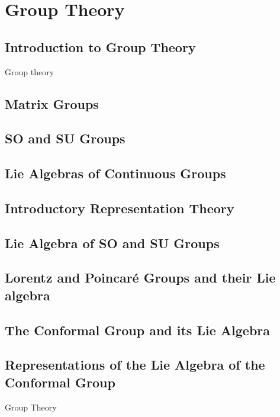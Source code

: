 \section{Group Theory}
\subsection{Introduction to Group Theory}
Group theory
\subsection{Matrix Groups}
\subsection{SO and SU Groups}
\subsection{Lie Algebras of Continuous Groups}
\subsection{Introductory Representation Theory}
\subsection{Lie Algebra of SO and SU Groups}
\subsection{Lorentz and Poincaré Groups and their Lie algebra}
\subsection{The Conformal Group and its Lie Algebra}
\subsection{Representations of the Lie Algebra of the Conformal Group}
Group Theory